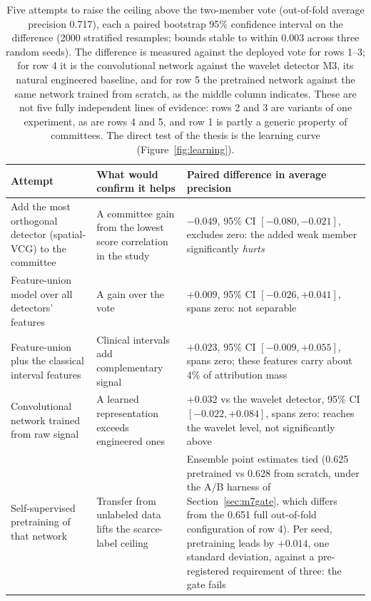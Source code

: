 \documentclass[11pt]{article}
\begin{document}
\begin{table}[t]
  \centering
  \small
  \caption{Five attempts to raise the ceiling above the two-member vote (out-of-fold average precision 0.717), each a paired bootstrap 95\% confidence interval on the difference (2000 stratified resamples; bounds stable to within 0.003 across three random seeds). The difference is measured against the deployed vote for rows 1--3; for row 4 it is the convolutional network against the wavelet detector M3, its natural engineered baseline, and for row 5 the pretrained network against the same network trained from scratch, as the middle column indicates. These are not five fully independent lines of evidence: rows 2 and 3 are variants of one experiment, as are rows 4 and 5, and row 1 is partly a generic property of committees. The direct test of the thesis is the learning curve (Figure~\ref{fig:learning}).}
  \label{tab:five}
  \begin{tabular}{@{}p{4.4cm}p{4.2cm}p{4.8cm}@{}}
    \toprule
    Attempt & What would confirm it helps & Paired difference in average precision \\
    \midrule
    Add the most orthogonal detector (spatial-VCG) to the committee & A committee gain from the lowest score correlation in the study & $-0.049$, 95\% CI $[-0.080, -0.021]$, excludes zero: the added weak member significantly \emph{hurts} \\
    Feature-union model over all detectors' features & A gain over the vote & $+0.009$, 95\% CI $[-0.026, +0.041]$, spans zero: not separable \\
    Feature-union plus the classical interval features & Clinical intervals add complementary signal & $+0.023$, 95\% CI $[-0.009, +0.055]$, spans zero; these features carry about 4\% of attribution mass \\
    Convolutional network trained from raw signal & A learned representation exceeds engineered ones & $+0.032$ vs the wavelet detector, 95\% CI $[-0.022, +0.084]$, spans zero: reaches the wavelet level, not significantly above \\
    Self-supervised pretraining of that network & Transfer from unlabeled data lifts the scarce-label ceiling & Ensemble point estimates tied (0.625 pretrained vs 0.628 from scratch, under the A/B harness of Section~\ref{sec:m7gate}, which differs from the 0.651 full out-of-fold configuration of row 4). Per seed, pretraining leads by $+0.014$, one standard deviation, against a pre-registered requirement of three: the gate fails \\
    \bottomrule
  \end{tabular}
\end{table}
\end{document}
